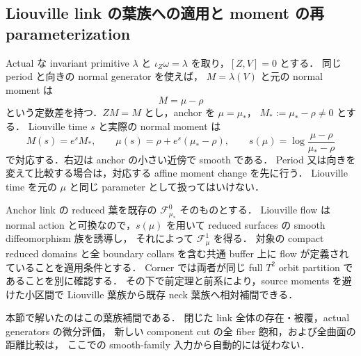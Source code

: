\subsection{Liouville link の葉族への適用と moment の再 parameterization}

Actual な invariant primitive $\lambda$ と
$\iota_Z\omega=\lambda$ を取り，$[Z,V]=0$ とする．
同じ period と向きの normal generator を使えば，
$M=\lambda(V)$ と元の normal moment は
\[
 M=\mu-\rho
\]
という定数差を持つ．$ZM=M$ とし，anchor を $\mu=\mu_*$，
$M_*:=\mu_*-\rho\ne0$ とする．
Liouville time $s$ と実際の normal moment は
\[
 M(s)=e^sM_*,\qquad
 \mu(s)=\rho+e^s(\mu_*-\rho),\qquad
 s(\mu)=\log\frac{\mu-\rho}{\mu_*-\rho}
\]
で対応する．右辺は anchor の小さい近傍で smooth である．
Period 又は向きを変えて比較する場合は，対応する affine moment change を先に行う．
Liouville time を元の $\mu$ と同じ parameter として扱ってはいけない．

Anchor link の reduced 葉を既存の $\mathcal F^0_{\mu_*}$ そのものとする．
Liouville flow は normal action と可換なので，$s(\mu)$ を用いて
reduced surfaces の smooth diffeomorphism 族を誘導し，
それによって $\mathcal F^1_\mu$ を得る．
対象の compact reduced domains と全 boundary collars を含む共通 buffer 上に
flow が定義されていることを適用条件とする．
Corner では両者が同じ full $T^2$ orbit partition であることを別に確認する．
その下で前定理と前系により，source moments を避けた小区間で
Liouville 葉族から既存 neck 葉族へ相対補間できる．

本節で解いたのはこの葉族補間である．
閉じた link 全体の存在・被覆，actual generators の微分評価，
新しい component cut の全 fiber 飽和，および全曲面の距離比較は，
ここでの smooth-family 入力から自動的には従わない．
